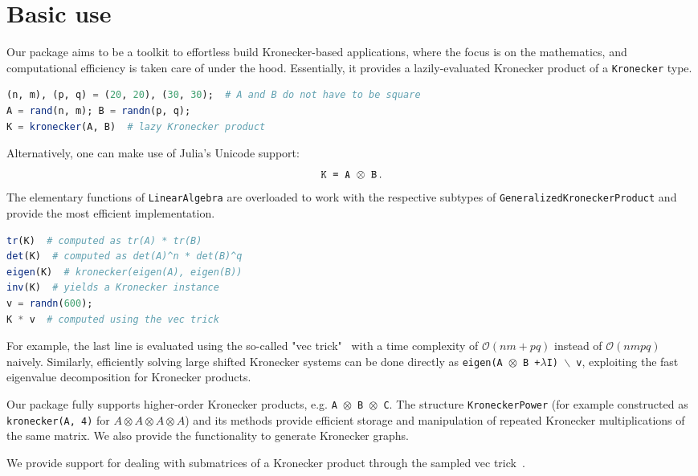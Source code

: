 \documentclass{juliacon}
\begin{document}
\section{Basic use}

Our package aims to be a toolkit to effortless build Kronecker-based applications, where the focus is on the mathematics, and computational efficiency is taken care of under the hood. Essentially, it provides a lazily-evaluated Kronecker product of a \texttt{Kronecker} type.

\begin{lstlisting}[language = Julia]
(n, m), (p, q) = (20, 20), (30, 30);  # A and B do not have to be square
A = rand(n, m); B = randn(p, q);
K = kronecker(A, B)  # lazy Kronecker product
\end{lstlisting}

Alternatively, one can make use of Julia's Unicode support:
$$
\text{\texttt{K = A $\otimes$ B}}\,.
$$
The elementary functions of \texttt{LinearAlgebra} are overloaded to work with the respective subtypes of \texttt{GeneralizedKroneckerProduct} and provide the most efficient implementation.

\begin{lstlisting}[language = Julia]
tr(K)  # computed as tr(A) * tr(B)
det(K)  # computed as det(A)^n * det(B)^q
eigen(K)  # kronecker(eigen(A), eigen(B))
inv(K)  # yields a Kronecker instance
v = randn(600);
K * v  # computed using the vec trick
\end{lstlisting}

For example, the last line is evaluated using the so-called "vec trick"~\cite{VanLoan2000} with a time complexity of $\mathcal{O}(nm+pq)$ instead of $\mathcal{O}(nmpq)$ naively.
Similarly, efficiently solving large shifted Kronecker systems can be done directly as \texttt{eigen(A $\otimes$ B +$\lambda$I) $\backslash$ v}, exploiting the fast eigenvalue decomposition for Kronecker products.

Our package fully supports higher-order Kronecker products, e.g. \texttt{A $\otimes$ B $\otimes$ C}.
The structure \texttt{KroneckerPower} (for example constructed as \texttt{kronecker(A, 4)} for $A \otimes A \otimes A \otimes A$) and its methods provide efficient storage and manipulation of repeated Kronecker multiplications of the same matrix. We also provide the functionality to generate Kronecker graphs.

We provide support for dealing with submatrices of a Kronecker product through the sampled vec trick~\cite{Airola2017genvectric}.
\end{document}
